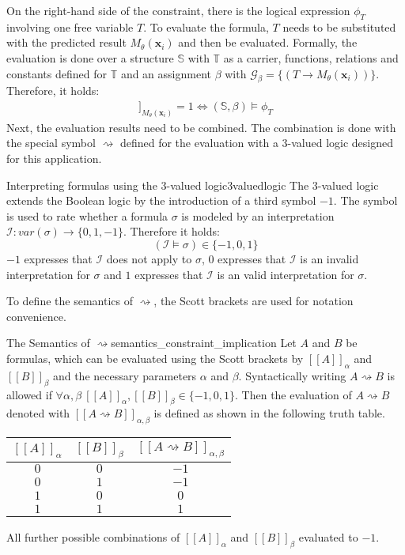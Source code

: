 On the right-hand side of the constraint, there is the logical expression $\phi_{T}$ involving one free variable $T$. To evaluate the formula, $T$ needs to be substituted with the predicted result $M_\theta(\mathbf{x}_i)$ and then be evaluated. Formally, the evaluation is done over a structure $\mathbb{S}$ with $\mathbb{T}$ as a carrier, functions, relations and constants defined for $\mathbb{T}$ and an assignment $\beta$ with $\mathcal{G_\beta} = \{(T \to M_\theta(\mathbf{x}_i))\}$.
Therefore, it holds:
\begin{gather}
    [[\phi_{T}]]_{M_\theta(\mathbf{x}_i)} = 1 \Leftrightarrow  (\mathbb{S},\beta) \models \phi_{T} \label{F:constraint_eval_2}
\end{gather}
Next, the evaluation results need to be combined. The combination is done with the special symbol $\rightsquigarrow$ defined for the evaluation with a 3-valued logic designed for this application.

\begin{Def}{Interpreting formulas using the 3-valued logic}{3valuedlogic}
The 3-valued logic extends the Boolean logic by the introduction of a third symbol $-1$. The symbol is used to rate whether a formula $\sigma$ is modeled by an interpretation $\mathcal{I}: var(\sigma) \to \{0,1,-1\}$. Therefore it holds: 
    \[(\mathcal{I} \models \sigma) \in \{-1,0,1\}\]
$-1$ expresses that $\mathcal{I}$ does not apply to $\sigma$, $0$ expresses that $\mathcal{I}$ is an invalid interpretation for $\sigma$ and $1$ expresses that $\mathcal{I}$ is an valid interpretation for $\sigma$.
\end{Def}

To define the semantics of $\rightsquigarrow$, the Scott brackets are used for notation convenience.

\begin{Def}{The Semantics of $\rightsquigarrow$}{semantics_constraint_implication}
Let $A$ and $B$ be formulas, which can be evaluated using the Scott brackets by $[[A]]_\alpha$ and $[[B]]_\beta$ and the necessary parameters $\alpha$ and $\beta$. Syntactically writing $A \rightsquigarrow B$ is allowed if $\forall \alpha, \beta ~ [[A]]_\alpha, [[B]]_\beta \in \{-1,0,1\}$. Then the evaluation of $A \rightsquigarrow B$ denoted with $[[A \rightsquigarrow B]]_{\alpha,\beta}$ is defined as shown in the following truth table.
\begin{center}
            \begin{tabular}{c|c|c}
             \toprule
             $[[A]]_\alpha$ & $[[B]]_\beta$ & $[[A \rightsquigarrow B]]_{\alpha,\beta}$ \\
             \midrule
             \midrule
             $0$ & $0$ & $-1$ \\
             $0$ & $1$ & $-1$ \\
             $1$ & $0$ & $0$ \\
             $1$ & $1$ & $1$ \\
             \bottomrule
        \end{tabular}
\end{center}
All further possible combinations of $[[A]]_\alpha$ and $[[B]]_\beta$ evaluated to $-1$.
\end{Def}

